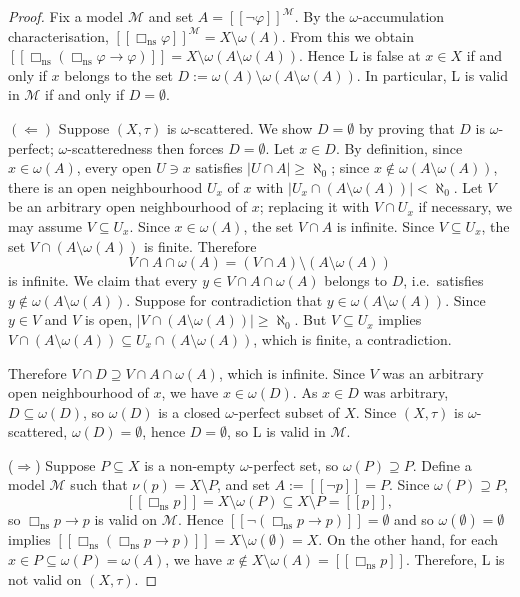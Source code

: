 \documentclass[submission,copyright,creativecommons]{eptcs}
\newcommand{\sem}[1]{[\![#1]\!]}
\newcommand{\sq}{\Box}
\begin{document}
\begin{proof}
Fix a model $\mathcal{M}$ and set $A = \sem{\neg\varphi}^{\mathcal{M}}$.
By the $\omega$-accumulation characterisation,  
$\sem{\sq_\mathrm{ns}\varphi}^{\mathcal{M}} = X \setminus \omega(A)$.
From this we obtain $ \sem{\sq_\mathrm{ns}(\sq_\mathrm{ns}\varphi \to \varphi)}
  = X \setminus \omega(A \setminus \omega(A))$.
Hence L is false at $x \in X$ if and only if $x$ belongs to the set $D := \omega(A) \setminus \omega(A \setminus \omega(A))$.
In particular, L is valid in $\mathcal{M}$ if and only if $D = \emptyset$.

\medskip
$(\Leftarrow)$
Suppose $(X,\tau)$ is $\omega$-scattered. We show $D = \emptyset$ by proving that $D$ is $\omega$-perfect; $\omega$-scatteredness then forces $D = \emptyset$.
Let $x \in D$. 
By definition, since $x \in \omega(A)$, every open $U\ni x$ satisfies
    $|U \cap A| \geq \aleph_0$; since $x \notin \omega(A \setminus \omega(A))$, there is an open
    neighbourhood $U_x$ of $x$ with
    $\bigl|U_x \cap (A \setminus \omega(A))\bigr| < \aleph_0$.
Let $V$ be an arbitrary open neighbourhood of $x$; replacing it with $V \cap U_x$ if necessary, we may assume $V \subseteq U_x$.
Since $x \in \omega(A)$, the set $V \cap A$ is infinite.
Since $V \subseteq U_x$, the set $V \cap (A \setminus \omega(A))$ is finite.
Therefore
\[
  V \cap A \cap \omega(A)
  = (V \cap A) \setminus (A \setminus \omega(A))
\]
is infinite.
We claim that every $y \in V \cap A \cap \omega(A)$ belongs to $D$, i.e.\
satisfies $y \notin \omega(A \setminus \omega(A))$.
Suppose for contradiction that $y \in \omega(A \setminus \omega(A))$.
Since $y \in V$ and $V$ is open, $\bigl|V \cap (A \setminus \omega(A))\bigr| \geq \aleph_0$.
But $V \subseteq U_x$ implies
$V \cap (A \setminus \omega(A)) \subseteq U_x \cap (A \setminus \omega(A))$,
which is finite, a contradiction.

Therefore $V \cap D \supseteq V \cap A \cap \omega(A)$, which is infinite.
Since $V$ was an arbitrary open neighbourhood of $x$, we have $x \in \omega(D)$.
As $x \in D$ was arbitrary, $D \subseteq \omega(D)$, so $\omega(D)$ is a closed $\omega$-perfect subset of $X$.
Since $(X,\tau)$ is $\omega$-scattered, $\omega(D) = \emptyset$, hence $D = \emptyset$, so L is valid in $\mathcal{M}$.


($\Rightarrow$) 
Suppose $P \subseteq X$ is a non-empty $\omega$-perfect set, so
$\omega(P) \supseteq P$. Define a model $\mathcal{M}$ such that $\nu(p) = X \setminus P$,
and set $A := \sem{\neg p} = P$.
Since $\omega(P) \supseteq P$,
\[
  \sem{\sq_\mathrm{ns} p} = X \setminus \omega(P) \subseteq X \setminus P = \sem{p},
\]
so $\sq_\mathrm{ns} p \to p$ is valid on $\mathcal{M}$.
Hence $\sem{\neg(\sq_\mathrm{ns} p \to p)} = \emptyset$ and so 
$\omega(\emptyset) = \emptyset$ implies
$\sem{\sq_\mathrm{ns}(\sq_\mathrm{ns} p \to p)} = X \setminus \omega(\emptyset) = X$.
On the other hand, for each $x \in P \subseteq \omega(P)=\omega(A)$, we have $x \notin X \setminus \omega(A) = \sem{\sq_\mathrm{ns} p}$.
Therefore, L is not valid on $(X,\tau)$.
\end{proof}
\end{document}
